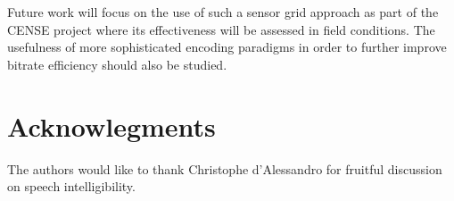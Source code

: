 \documentclass[sensors,article,submit,moreauthors,pdftex,10pt,a4paper]{mdpi}
\begin{document}
Future work will focus on the use of such a sensor grid approach as part of the CENSE project where its effectiveness will be assessed in field conditions. The usefulness of more sophisticated encoding paradigms in order to further improve bitrate efficiency should also be studied.

\section{Acknowlegments}

The authors would like to thank Christophe d'Alessandro for fruitful discussion on speech intelligibility.

%


\end{document}
